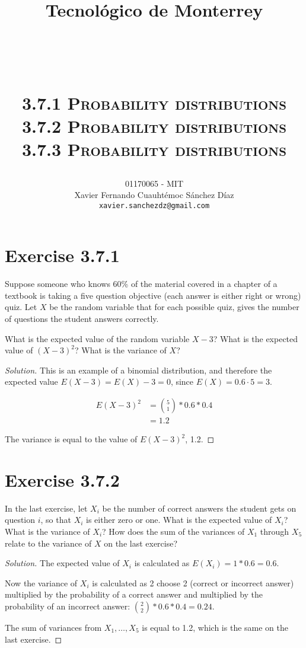 \documentclass[titlepage, letterpaper, fleqn]{article}
\title{
\vspace{1in}
\textbf{Tecnológico de Monterrey} \\
\vspace{0.5in}
\textmd{\mahclass} \\
\large{\textit{\mahteacher}} \\
\vspace{0.5in}
\textsc{\mahtitle}\\
\textsc{3.7.1 Probability distributions}\\
\textsc{3.7.2 Probability distributions}\\
\textsc{3.7.3 Probability distributions}\\
\author{01170065  - MIT \\
Xavier Fernando Cuauhtémoc Sánchez Díaz \\
\texttt{xavier.sanchezdz@gmail.com}}
\date{\mahdate}
}
\newcommand{\spacepls}{\vspace{5mm}}
\renewcommand\qedsymbol{\(\blacksquare\)}
\newenvironment{solution}
{\renewcommand\qedsymbol{$\square$}\begin{proof}[Solution]}
{\end{proof}}
\begin{document}
\begin{titlepage}
\maketitle
\end{titlepage}

%
%

\section{Exercise 3.7.1}

{\large Suppose someone who knows 60\% of the material covered in a chapter of a textbook is taking a five question objective (each answer is either right or wrong) quiz.
Let \(X\) be the random variable that for each possible quiz,
gives the number of questions the student answers correctly.

What is the expected value of the random variable \(X - 3\)?
What is the expected value of \((X - 3)^2\)?
What is the variance of \(X\)?}

\begin{solution}
This is an example of a binomial distribution, and therefore the expected value \(E(X - 3) = E(X) - 3 = 0\), since \(E(X) = 0.6 \cdot 5 = 3\).

\begin{align*}
E(X -3)^2 & = \binom{5}{1} * 0.6 * 0.4 \\
& = 1.2
\end{align*}

The variance is equal to the value of \(E(X-3)^2\), 1.2.
\end{solution}

\spacepls

\section{Exercise 3.7.2}

{\large In the last exercise, let \(X_i\) be the number of correct answers the student gets on question \(i\), so that \(X_i\) is either zero or one.
What is the expected value of \(X_i\)?
What is the variance of \(X_i\)?
How does the sum of the variances of \(X_1\) through \(X_5\) relate to the variance of \(X\) on the last exercise?}

\begin{solution}
The expected value of \(X_i\) is calculated as \(E(X_i) = 1 * 0.6 = 0.6\).

Now the variance of \(X_i\) is calculated as 2 choose 2 (correct or incorrect answer) multiplied by the probability of a correct answer and multiplied by the probability of an incorrect answer:
\(\binom{2}{2} * 0.6 * 0.4 = 0.24\).

The sum of variances from \(X_1, \dots , X_5\) is equal to 1.2, which is the same on the last exercise.
\end{solution}
\end{document}
